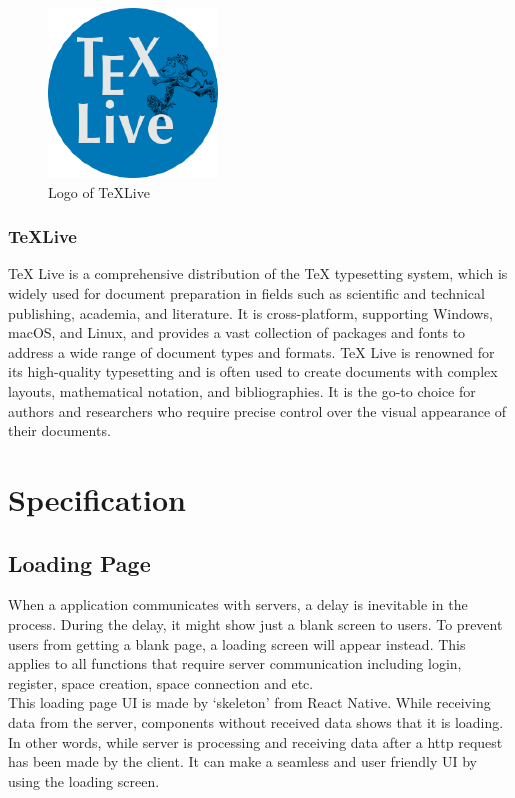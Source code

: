 \documentclass[conference]{IEEEtran}
\begin{document}
        \begin{figure}[htbp]
        \centerline{\includegraphics[width=4.5cm]{Images/logo/texlive.png}}
        \label{fig}
        \caption{Logo of TeXLive}
        \end{figure}
        \subsubsection{TeXLive}
        TeX Live is a comprehensive distribution of the TeX typesetting system, which is widely used for document preparation in fields such as scientific and technical publishing, academia, and literature. It is cross-platform, supporting Windows, macOS, and Linux, and provides a vast collection of packages and fonts to address a wide range of document types and formats. TeX Live is renowned for its high-quality typesetting and is often used to create documents with complex layouts, mathematical notation, and bibliographies. It is the go-to choice for authors and researchers who require precise control over the visual appearance of their documents.\\

\section{Specification}
    \subsection{Loading Page}
        When a application communicates with servers, a delay is inevitable in the process. During the delay, it might show just a blank screen to users. To prevent users from getting a blank page, a loading screen will appear instead. This applies to all functions that require server communication including login, register, space creation, space connection and etc. \\
        This loading page UI is made by ‘skeleton’ from React Native. While receiving data from the server, components without received data shows that it is loading. In other words, while server is processing and receiving data after a http request has been made by the client. It can make a seamless and user friendly UI by using the loading screen.
\end{document}
